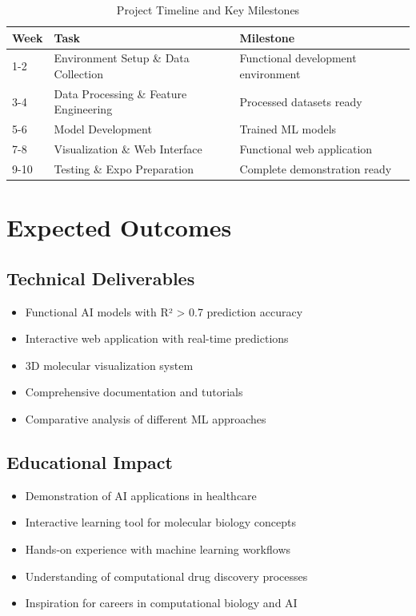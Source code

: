 \documentclass[12pt,a4paper]{article}
\begin{document}
\begin{table}[h!]
\centering
\begin{tabular}{|l|l|l|}
\hline
\textbf{Week} & \textbf{Task} & \textbf{Milestone} \\
\hline
1-2 & Environment Setup \& Data Collection & Functional development environment \\
\hline
3-4 & Data Processing \& Feature Engineering & Processed datasets ready \\
\hline
5-6 & Model Development & Trained ML models \\
\hline
7-8 & Visualization \& Web Interface & Functional web application \\
\hline
9-10 & Testing \& Expo Preparation & Complete demonstration ready \\
\hline
\end{tabular}
\caption{Project Timeline and Key Milestones}
\end{table}

\section{Expected Outcomes}

\subsection{Technical Deliverables}
\begin{itemize}
    \item Functional AI models with R² > 0.7 prediction accuracy
    \item Interactive web application with real-time predictions
    \item 3D molecular visualization system
    \item Comprehensive documentation and tutorials
    \item Comparative analysis of different ML approaches
\end{itemize}

\subsection{Educational Impact}
\begin{itemize}
    \item Demonstration of AI applications in healthcare
    \item Interactive learning tool for molecular biology concepts
    \item Hands-on experience with machine learning workflows
    \item Understanding of computational drug discovery processes
    \item Inspiration for careers in computational biology and AI
\end{itemize}
\end{document}
